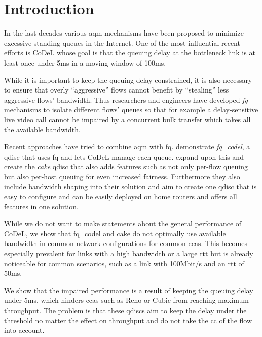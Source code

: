 \documentclass[10pt,sigconf,letterpaper,dvipsnames\ifx\removeHeaders\tempYes ,nonacm\fi\ifx\removeHeaders\tempNo ,anonymous\fi]{acmart}
\begin{document}
\newcommand{\codel}{CoDeL}

\maketitle

\section{Introduction}

In the last decades various \gls{aqm} mechanisms have been proposed to minimize excessive standing queues in the Internet. One of the most influential recent efforts is \codel{} \cite{nichols_controlling_2012} whose goal is that the queuing delay at the bottleneck link is at least once under 5\;ms in a moving window of 100\;ms. 

While it is important to keep the queuing delay constrained, it is also necessary to ensure that overly ``aggressive'' flows cannot benefit by ``stealing'' less aggressive flows' bandwidth. Thus researchers and engineers have developed \textit{\gls{fq}} mechanisms \cite{shreedhar_efficient_1996,dumazet_pkt_sched:_2013} to isolate different flows' queues so that for example a delay-sensitive live video call cannot be impaired by a concurrent bulk transfer which takes all the available bandwidth. 

Recent approaches have tried to combine \gls{aqm} with \gls{fq}. \cite{taht_flow_2018} demonstrate \textit{fq\_codel}, a \gls{qdisc} that uses \gls{fq} and lets \codel{} manage each queue. \cite{hoiland-jorgensen_piece_2018} expand upon this and create the \textit{cake} \gls{qdisc} that also adds features such as not only per-flow queuing but also per-host queuing for even increased fairness. Furthermore they also include bandwidth shaping into their solution and aim to create one \gls{qdisc} that is easy to configure and can be easily deployed on home routers and offers all features in one solution. 

While we do not want to make statements about the general performance of \codel{}, we show that fq\_codel and cake do not optimally use available bandwidth in common network configurations for common \glspl{cca}. This becomes especially prevalent for links with a high bandwidth or a large \gls{rtt} but is already noticeable for common scenarios, such as a link with 100\;Mbit/s and an \gls{rtt} of 50\;ms. 

We show that the impaired performance is a result of keeping the queuing delay under 5\;ms, which hinders \glspl{cca} such as Reno or Cubic from reaching maximum throughput. The problem is that these \glspl{qdisc} aim to keep the delay under the threshold no matter the effect on throughput and do not take the \gls{cc} of the flow into account. 
\end{document}
